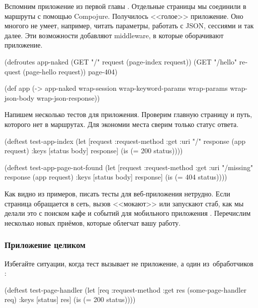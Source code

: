 Вспомним приложение из первой главы . Отдельные страницы мы
соединили в маршруты с помощью Compojure. Получилось <<голое>> приложение. Оно
многого не умеет, например, читать параметры, работать с JSON, сессиями и так
далее. Эти возможности добавляют middleware, в которые оборачивают приложение.


\begin{english}
  \begin{clojure}
(defroutes app-naked
  (GET "/"      request (page-index request))
  (GET "/hello" request (page-hello request))
  page-404)

(def app
  (-> app-naked
      wrap-session
      wrap-keyword-params
      wrap-params
      wrap-json-body
      wrap-json-response))
  \end{clojure}
\end{english}

Напишем несколько тестов для приложения. Проверим главную страницу и путь,
которого нет в маршрутах. Для экономии места сверим только статус ответа.

\begin{english}
  \begin{clojure}
(deftest test-app-index
  (let [request {:request-method :get :uri "/"}
        response (app request)
        {:keys [status body]} response]
    (is (= 200 status))))

(deftest test-app-page-not-found
  (let [request {:request-method :get :uri "/missing"}
        response (app request)
        {:keys [status body]} response]
    (is (= 404 status))))
  \end{clojure}
\end{english}


Как видно из примеров, писать тесты для веб-приложения нетрудно. Если страница
обращается в сеть, вызов <<мокают>> или запускают стаб, как мы делали это с
поиском кафе и событий для мобильного приложения .
Перечислим несколько новых приёмов, которые облегчат вашу работу.

\subsubsection*{Приложение целиком}

Избегайте ситуации, когда тест вызывает не приложение, а один из~обработчиков
:

\begin{english}
  \begin{clojure/lines}
(deftest test-page-handler
  (let [req {:request-method :get}
        res (some-page-handler req)
        {:keys [status]} res]
    (is (= 200 status))))
  \end{clojure/lines}
\end{english}


